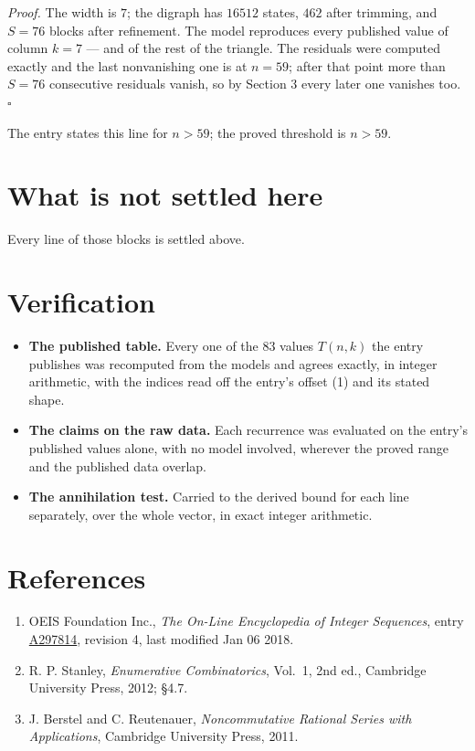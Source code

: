 \documentclass[11pt]{article}
\theoremstyle{definition}
\begin{document}
{\itshape Proof.} The width is $7$; the digraph has $16512$ states, $462$ after trimming, and $S = 76$ blocks after refinement. The model reproduces every published value of column $k = 7$ --- and of the rest of the triangle. The residuals were computed exactly and the last nonvanishing one is at $n = 59$; after that point more than $S = 76$ consecutive residuals vanish, so by Section 3 every later one vanishes too. $\square$

The entry states this line for $n > 59$; the proved threshold is $n > 59$.

\section{What is not settled here}

Every line of those blocks is settled above.

\section{Verification}

\begin{itemize}

\item {\bfseries The published table.} Every one of the 83 values $T(n,k)$ the entry publishes was recomputed from the models and agrees exactly, in integer arithmetic, with the indices read off the entry's offset (1) and its stated shape.

\item {\bfseries The claims on the raw data.} Each recurrence was evaluated on the entry's published values alone, with no model involved, wherever the proved range and the published data overlap.

\item {\bfseries The annihilation test.} Carried to the derived bound for each line separately, over the whole vector, in exact integer arithmetic.

\end{itemize}

\section{References}

\begin{enumerate}

\item OEIS Foundation Inc., \emph{The On-Line Encyclopedia of Integer Sequences}, entry \href{https://oeis.org/A297814}{A297814}, revision 4, last modified Jan 06 2018.

\item R. P. Stanley, \emph{Enumerative Combinatorics}, Vol.~1, 2nd ed., Cambridge University Press, 2012; \S4.7.

\item J. Berstel and C. Reutenauer, \emph{Noncommutative Rational Series with Applications}, Cambridge University Press, 2011.

\end{enumerate}
\end{document}
